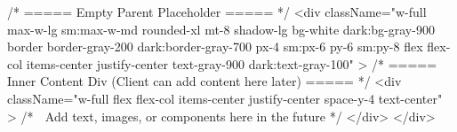 {/* ===== Empty Parent Placeholder ===== */}
<div
  className="w-full max-w-lg sm:max-w-md rounded-xl mt-8 shadow-lg 
             bg-white dark:bg-gray-900 
             border border-gray-200 dark:border-gray-700 
             px-4 sm:px-6 py-6 sm:py-8 
             flex flex-col items-center justify-center 
             text-gray-900 dark:text-gray-100"
>
  {/* ===== Inner Content Div (Client can add content here later) ===== */}
  <div
    className="w-full flex flex-col items-center justify-center 
               space-y-4 text-center"
  >
    {/* 🔹 Add text, images, or components here in the future */}
  </div>
</div>
